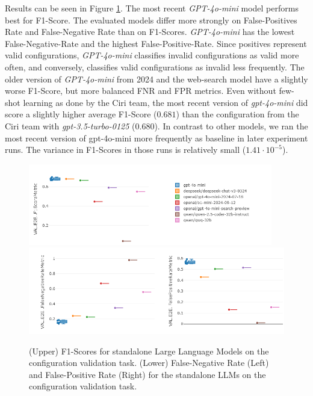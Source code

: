 Results can be seen in Figure \ref{fig:LLMStandalone-Results}. The most recent \textit{GPT-4o-mini} model performs best for F1-Score. The evaluated models differ more strongly on False-Positives Rate and False-Negative Rate than on F1-Scores. \textit{GPT-4o-mini} has the lowest False-Negative-Rate and the highest False-Positive-Rate. Since positives represent valid configurations, \textit{GPT-4o-mini} classifies invalid configurations as valid more often, and conversely, classifies valid configurations as invalid less frequently. The older version of \textit{GPT-4o-mini} from 2024 and the web-search model have a slightly worse F1-Score, but more balanced FNR and FPR metrics. Even without few-shot learning as done by the Ciri team, the most recent version of \textit{gpt-4o-mini} did score a slightly higher average F1-Score ($0.681$) than the configuration from the Ciri team with \textit{gpt-3.5-turbo-0125} ($0.680$). In contrast to other models, we ran the most recent version of gpt-4o-mini more frequently as baseline in later experiment runs. The variance in F1-Scores in those runs is relatively small ($1.41 \cdot 10^{-5}$).


\begin{figure}[h]
    \centering
    \includegraphics[width=0.95\textwidth]{images/LLMStandalone-by-model.png}\\[6pt]
    \includegraphics[width=\textwidth]{images/LLMStandalone-by-model-FNRFPR.png}
    \caption{(Upper) F1-Scores for standalone Large Language Models on the configuration validation task. (Lower) False-Negative Rate (Left) and False-Positive Rate (Right) for the standalone LLMs on the configuration validation task.}
    \label{fig:LLMStandalone-Results}
  \end{figure}

